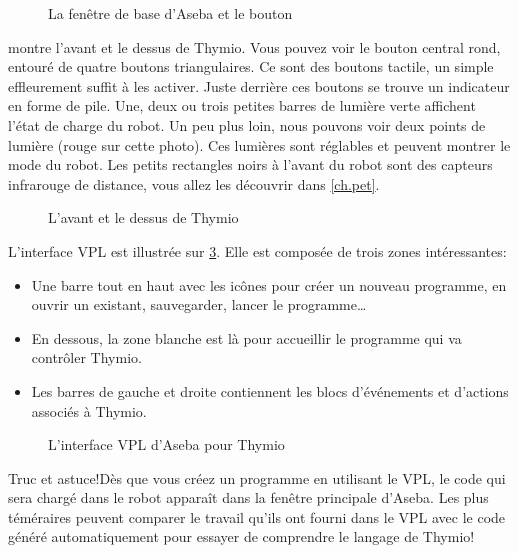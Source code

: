 \begin{figure}
\begin{center}
\caption{La fenêtre de base d'Aseba et le bouton }\label{fig.Aseba}
\end{center}
\end{figure} 


 montre l'avant et le dessus de Thymio. Vous pouvez voir le bouton central rond, entouré de quatre boutons triangulaires. Ce sont des boutons tactile, un simple effleurement suffit à les activer. Juste derrière ces boutons se trouve un indicateur en forme de pile. Une, deux ou trois petites barres de lumière verte affichent l'état de charge du robot. Un peu plus loin, nous pouvons voir deux points de lumière (rouge sur cette photo). Ces lumières sont réglables et peuvent montrer le mode du robot. Les petits rectangles noirs à l'avant du robot sont des capteurs infrarouge de distance, vous allez les découvrir dans \cref{ch.pet}.

\begin{figure}[h]
\begin{center}
\caption{L'avant et le dessus de Thymio}\label{fig.front}
\end{center}
\end{figure} 


L'interface VPL est illustrée sur \cref{fig.gui}. Elle est composée de trois zones intéressantes:

\begin{itemize}
	\item Une barre tout en haut avec les icônes pour créer un nouveau programme, en ouvrir un existant, sauvegarder, lancer le programme\ldots
	\item En dessous, la zone blanche est là pour accueillir le programme qui va contrôler Thymio.
	\item Les barres de gauche et droite contiennent les blocs d'événements et d'actions associés à Thymio.
\end{itemize}

\begin{figure}[hbt]
\caption{L'interface VPL d'Aseba pour Thymio}\label{fig.gui}
\end{figure}

\begin{bclogo}[couleur = blue!30, arrondi = 0.1, logo = \bcinfo, ombre = true]{Truc et astuce!}Dès que vous créez un programme en utilisant le VPL, le code qui sera chargé dans le robot apparaît dans la fenêtre principale d'Aseba. Les plus téméraires peuvent comparer le travail qu'ils ont fourni dans le VPL avec le code généré automatiquement pour essayer de comprendre le langage de Thymio!
\end{bclogo}


